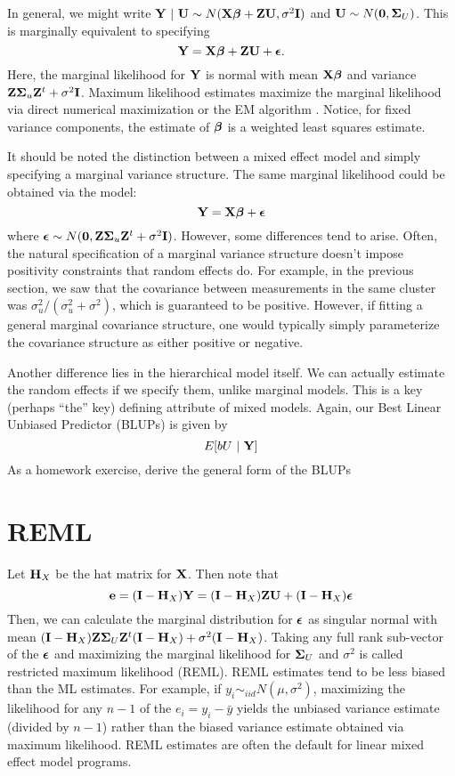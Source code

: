 In general, we might write $\mathbf{Y} ~|~ \mathbf{U} \sim N(\mathbf{X} \boldsymbol{\beta} + \mathbf{Z} \mathbf{U}, \sigma^2 \mathbf{I})$ and
$\mathbf{U} \sim N(\mathbf{0}, \boldsymbol{\Sigma}_U)$. This is marginally equivalent to specifying
$$
\mathbf{Y} = \mathbf{X} \boldsymbol{\beta} + \mathbf{Z} \mathbf{U} + \boldsymbol{\epsilon}. 
$$
Here, the marginal likelihood for $\mathbf{Y}$ is normal with mean $\mathbf{X} \boldsymbol{\beta}$ and
variance $\mathbf{Z} \boldsymbol{\Sigma}_u \mathbf{Z}^t + \sigma^2 \mathbf{I}$. Maximum likelihood estimates
maximize the marginal likelihood via direct numerical maximization or 
the EM algorithm \citep{dempster1977maximum}. Notice, for fixed variance
components, the estimate of $\boldsymbol{\beta}$ is a weighted least squares estimate.

It should be noted the distinction between a mixed effect model and simply
specifying a marginal variance structure. The same marginal likelihood
could be obtained via the model:
$$
\mathbf{Y} = \mathbf{X} \boldsymbol{\beta} + \boldsymbol{\epsilon}
$$
where $\boldsymbol{\epsilon} \sim N(\mathbf{0}, \mathbf{Z} \boldsymbol{\Sigma}_u \mathbf{Z}^t + \sigma^2 \mathbf{I})$. However,
some differences tend to arise. Often, the natural specification of a marginal
variance structure doesn't impose positivity constraints that random effects
do. For example, in the previous section, we saw that the covariance between
measurements in the same cluster was $\sigma^2_u / (\sigma^2_u + \sigma^2)$,
which is guaranteed to be positive. However, if fitting a general marginal
covariance structure, one would typically simply parameterize the covariance
structure as either positive or negative. 

Another difference lies in the hierarchical model itself. We can actually
estimate the random effects if we specify them, unlike marginal models.
This is a key (perhaps ``the'' key) defining attribute of mixed models.
Again, our Best Linear Unbiased Predictor (BLUPs) is given by 
$$
E[bU ~|~ \mathbf{Y}]
$$
As a homework exercise, derive the general form of the BLUPs 


\section{REML}

Let $\mathbf{H}_X$ be the hat matrix for $\mathbf{X}$. Then note that
$$
\mathbf{e}=(\mathbf{I} - \mathbf{H}_X) \mathbf{Y} = (\mathbf{I} - \mathbf{H}_X) \mathbf{Z} \mathbf{U} + (\mathbf{I} - \mathbf{H}_X) \boldsymbol{\epsilon}
$$
Then, we can calculate the marginal distribution for $\boldsymbol{\epsilon}$ as
singular normal with mean $(\mathbf{I} - \mathbf{H}_X) \mathbf{Z} \boldsymbol{\Sigma}_U \mathbf{Z}^t (\mathbf{I} - \mathbf{H}_X) + \sigma^2 (\mathbf{I} - \mathbf{H}_X)$. 
Taking any full rank sub-vector of the $\boldsymbol{\epsilon}$ and maximizing the marginal likelihood
for $\boldsymbol{\Sigma}_U$ and $\sigma^2$ is called restricted maximum likelihood (REML). 
REML estimates tend to be less biased than the ML estimates. For example, if 
$y_i \sim_{iid} N(\mu, \sigma^2)$, maximizing the likelihood for 
any $n-1$ of the $e_i = y_i - \bar y$ yields the unbiased variance estimate (divided by $n-1$)
rather than the biased variance estimate obtained via maximum likelihood.
REML estimates are often the default for linear mixed effect model programs. 

